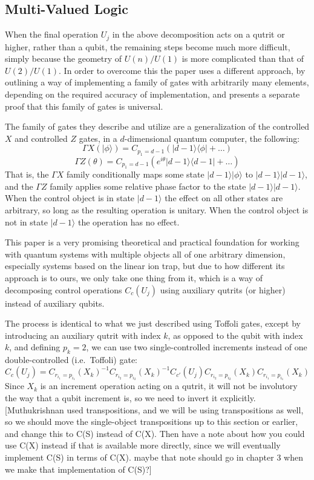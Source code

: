 \documentclass[]{article}
\newcommand{\bra}[1]{\langle #1 |}
\newcommand{\ket}[1]{| #1 \rangle}
\begin{document}
\subsection{Multi-Valued Logic}
When the final operation $U_j$ in the above decomposition acts on a qutrit or higher, rather than a qubit, the remaining steps become much more difficult, simply because the geometry of $U(n)/U(1)$ is more complicated than that of $U(2)/U(1)$. In order to overcome this the paper \cite{multi-valued-logic} uses a different approach, by outlining a way of implementing a family of gates with arbitrarily many elements, depending on the required accuracy of implementation, and presents a separate proof that this family of gates is universal.

The family of gates they describe and utilize are a generalization of the controlled $X$ and controlled $Z$ gates, in a $d$-dimensional quantum computer, the following:
\[\Gamma X(\ket{\phi}) = C_{p_1 = d-1}(\ket{d-1}\bra{\phi} + \dots)\]
\[\Gamma Z(\theta) = C_{p_1 = d-1}\left(e^{i\theta}\ket{d-1}\bra{d-1} + \dots\right)\]
That is, the $\Gamma X$ family conditionally maps some state $\ket{d-1}\ket{\phi}$ to $\ket{d-1}\ket{d-1}$, and the $\Gamma Z$ family applies some relative phase factor to the state $\ket{d-1}\ket{d-1}$. When the control object is in state $\ket{d-1}$ the effect on all other states are arbitrary, so long as the resulting operation is unitary. When the control object is not in state $\ket{d-1}$ the operation has no effect.

This paper is a very promising theoretical and practical foundation for working with quantum systems with multiple objects all of one arbitrary dimension, especially systems based on the linear ion trap, but due to how different its approach is to ours, we only take one thing from it, which is a way of decomposing control operations $C_c(U_j)$ using auxiliary qutrits (or higher) instead of auxiliary qubits.

The process is identical to what we just described using Toffoli gates, except by introducing an auxiliary qutrit with index $k$, as opposed to the qubit with index $k$, and defining $p_k = 2$, we can use two single-controlled increments instead of one double-controlled (i.e.\ Toffoli) gate:
\[
C_c(U_j) = C_{r_{i_1}=p_{i_1}}(X_k)^{-1}
C_{r_{i_2}=p_{i_2}}(X_k)^{-1}
C_{c'}(U_j)
C_{r_{i_2}=p_{i_2}}(X_k)
C_{r_{i_1}=p_{i_1}}(X_k)
\]
Since $X_k$ is an increment operation acting on a qutrit, it will not be involutory the way that a qubit increment is, so we need to invert it explicitly. [Muthukrishnan used transpositions, and we will be using transpositions as well, so we should move the single-object transpositions up to this section or earlier, and change this to C(S) instead of C(X). Then have a note about how you could use C(X) instead if that is available more directly, since we will eventually implement C(S) in terms of C(X). maybe that note should go in chapter 3 when we make that implementation of C(S)?]
\end{document}
